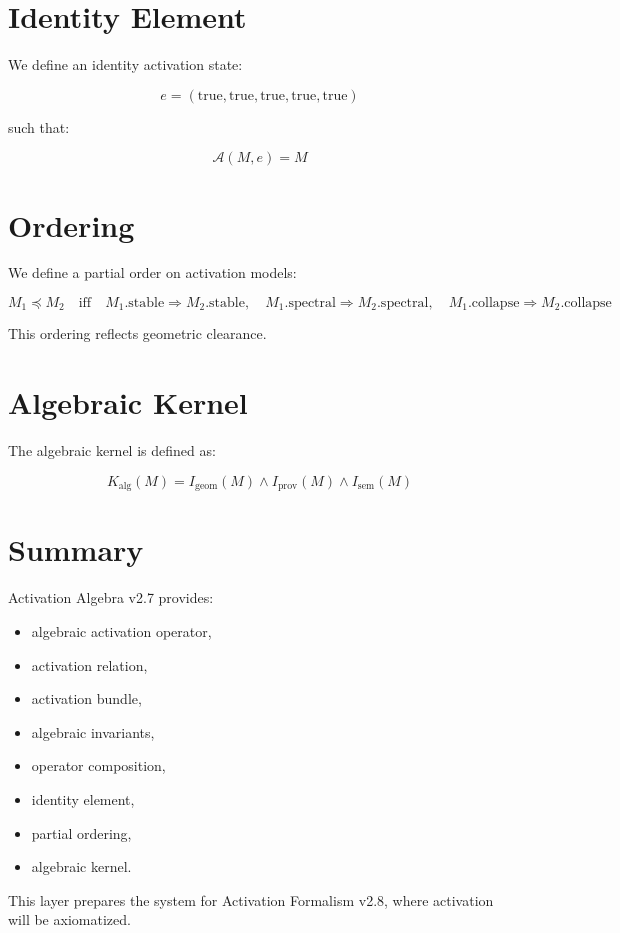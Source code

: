 \documentclass[11pt]{article}
\begin{document}
\section*{Identity Element}

We define an identity activation state:

\[
e = ( \text{true}, \text{true}, \text{true},
      \text{true}, \text{true} )
\]

such that:

\[
\mathcal{A}(M, e) = M
\]

\section*{Ordering}

We define a partial order on activation models:

\[
M_1 \preceq M_2
\quad \text{iff} \quad
M_1.\text{stable} \Rightarrow M_2.\text{stable},
\quad
M_1.\text{spectral} \Rightarrow M_2.\text{spectral},
\quad
M_1.\text{collapse} \Rightarrow M_2.\text{collapse}
\]

This ordering reflects geometric clearance.

\section*{Algebraic Kernel}

The algebraic kernel is defined as:

\[
K_{\text{alg}}(M) =
  I_{\text{geom}}(M) \land I_{\text{prov}}(M) \land I_{\text{sem}}(M)
\]

\section*{Summary}

Activation Algebra v2.7 provides:

\begin{itemize}
\item algebraic activation operator,
\item activation relation,
\item activation bundle,
\item algebraic invariants,
\item operator composition,
\item identity element,
\item partial ordering,
\item algebraic kernel.
\end{itemize}

This layer prepares the system for Activation Formalism v2.8, where activation
will be axiomatized.
\end{document}
